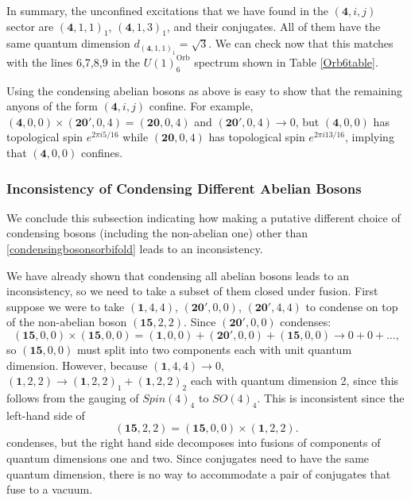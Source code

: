 \documentclass[11pt]{article}
\numberwithin{equation}{section}
\begin{document}
In summary, the unconfined excitations that we have found in the $(\mathbf{4},i,j)$ sector are $(\mathbf{4},1,1)_{1}$, $(\mathbf{4},1,3)_{1}$, and their conjugates. All of them have the same quantum dimension $d_{(\mathbf{4},1,1)_{1}} = \sqrt{3}$. We can check now that this matches with the lines 6,7,8,9 in the $U(1)^{\mathrm{Orb}}_{6}$ spectrum shown in Table \ref{Orb6table}.

Using the condensing abelian bosons as above is easy to show that the remaining anyons of the form $(\mathbf{4},i,j)$ confine. For example, $(\mathbf{4},0,0) \times (\mathbf{20}',0,4) = (\mathbf{20},0,4)$ and $(\mathbf{20}',0,4) \to 0$, but $(\mathbf{4},0,0)$ has topological spin $e^{2 \pi i 5/16}$ while $(\mathbf{20},0,4)$ has topological spin $e^{2 \pi i 13/16}$, implying that $(\mathbf{4},0,0)$ confines.

\subsubsection*{Inconsistency of Condensing Different Abelian Bosons}

We conclude this subsection indicating how making a putative different choice of condensing bosons (including the non-abelian one) other than \eqref{condensingbosonsorbifold} leads to an inconsistency.

We have already shown that condensing all abelian bosons leads to an inconsistency, so we need to take a subset of them closed under fusion. First suppose we were to take $(\mathbf{1},4,4)$, $(\mathbf{20}',0,0)$, $(\mathbf{20}',4,4)$ to condense on top of the non-abelian boson $(\mathbf{15},2,2)$. Since $(\mathbf{20}',0,0)$ condenses:
\begin{equation} \label{1500fusion1500}
    (\mathbf{15},0,0) \times (\mathbf{15},0,0) = (\mathbf{1},0,0) + (\mathbf{20}',0,0) + (\mathbf{15},0,0) \longrightarrow 0 + 0 + \ldots,
\end{equation}
so $(\mathbf{15},0,0)$ must split into two components each with unit quantum dimension. However, because $(\mathbf{1},4,4) \to 0$, $(\mathbf{1},2,2) \to (\mathbf{1},2,2)_{1} + (\mathbf{1},2,2)_{2}$ each with quantum dimension 2, since this follows from the gauging of $Spin(4)_{4}$ to $SO(4)_{4}$. This is inconsistent since the left-hand side of
\begin{equation} \label{1500fusion122}
    (\mathbf{15},2,2) = (\mathbf{15},0,0) \times (\mathbf{1},2,2).
\end{equation}
condenses, but the right hand side decomposes into fusions of components of quantum dimensions one and two. Since conjugates need to have the same quantum dimension, there is no way to accommodate a pair of conjugates that fuse to a vacuum.
\end{document}

